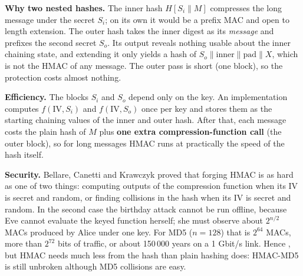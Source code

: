\textbf{Why two nested hashes.} The inner hash $H[S_i \| M]$ compresses the long message under the secret $S_i$; on its own it would be a prefix MAC and open to length extension. The outer hash takes the inner digest as its \emph{message} and prefixes the second secret $S_o$. Its output reveals nothing usable about the inner chaining state, and extending it only yields a hash of $S_o \| \text{inner} \| \text{pad} \| X$, which is not the HMAC of any message. The outer pass is short (one block), so the protection costs almost nothing.

\textbf{Efficiency.} The blocks $S_i$ and $S_o$ depend only on the key. An implementation computes $f(\mathrm{IV}, S_i)$ and $f(\mathrm{IV}, S_o)$ once per key and stores them as the starting chaining values of the inner and outer hash. After that, each message costs the plain hash of $M$ plus \textbf{one extra compression-function call} (the outer block), so for long messages HMAC runs at practically the speed of the hash itself.

\textbf{Security.} Bellare, Canetti and Krawczyk proved that forging HMAC is as hard as one of two things: computing outputs of the compression function when its IV is secret and random, or finding collisions in the hash when its IV is secret and random. In the second case the birthday attack cannot be run offline, because Eve cannot evaluate the keyed function herself; she must observe about $2^{n/2}$ MACs produced by Alice under one key. For MD5 ($n = 128$) that is $2^{64}$ MACs, more than $2^{72}$ bits of traffic, or about 150\,000 years on a 1 Gbit/s link. Hence , but HMAC needs much less from the hash than plain hashing does: HMAC-MD5 is still unbroken although MD5 collisions are easy.

